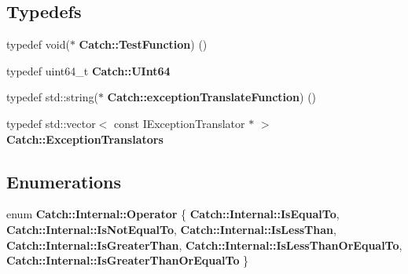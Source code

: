 \subsection*{Typedefs}
\begin{DoxyCompactItemize}
\item 
typedef void($\ast$ \textbf{ Catch\+::\+Test\+Function}) ()
\item 
typedef uint64\+\_\+t \textbf{ Catch\+::\+U\+Int64}
\item 
typedef std\+::string($\ast$ \textbf{ Catch\+::exception\+Translate\+Function}) ()
\item 
typedef std\+::vector$<$ const I\+Exception\+Translator $\ast$ $>$ \textbf{ Catch\+::\+Exception\+Translators}
\end{DoxyCompactItemize}
\subsection*{Enumerations}
\begin{DoxyCompactItemize}
\item 
enum \textbf{ Catch\+::\+Internal\+::\+Operator} \{ \newline
\textbf{ Catch\+::\+Internal\+::\+Is\+Equal\+To}, 
\textbf{ Catch\+::\+Internal\+::\+Is\+Not\+Equal\+To}, 
\textbf{ Catch\+::\+Internal\+::\+Is\+Less\+Than}, 
\textbf{ Catch\+::\+Internal\+::\+Is\+Greater\+Than}, 
\newline
\textbf{ Catch\+::\+Internal\+::\+Is\+Less\+Than\+Or\+Equal\+To}, 
\textbf{ Catch\+::\+Internal\+::\+Is\+Greater\+Than\+Or\+Equal\+To}
 \}
\end{DoxyCompactItemize}
